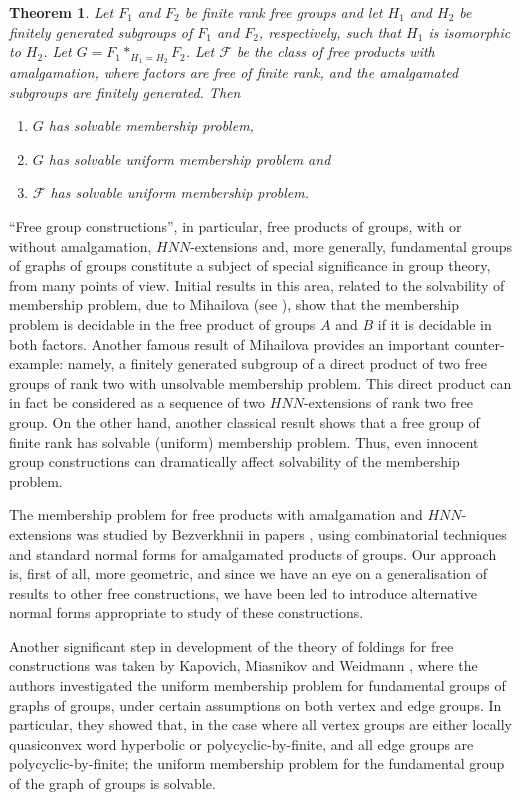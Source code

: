 \documentclass[a4paper,12pt]{article}
\newcommand{\cF}{{\cal{F}}}
\newtheorem{theorem}{Theorem}[section]
\numberwithin{equation}{section}
\numberwithin{figure}{section}
\renewcommand{\cF}{\mathcal{F}}
\newcommand{\be}{\begin{enumerate}}
\newcommand{\ee}{\end{enumerate}}
\begin{document}
\begin{theorem}\label{thm:membership}
Let $F_1$ and $F_2$ be finite rank free groups and let $H_1$ and $H_2$
be finitely generated subgroups of $F_1$ and $F_2$, respectively, such
that $H_1$ is isomorphic to $H_2$. Let $G=F_1 \ast_{H_1=H_2} F_2$. 
Let $\cF$ be the class of free products with amalgamation, where
factors are free of finite rank, and the amalgamated subgroups are
finitely generated. 
Then
\be
\item\label{it:membership}
$G$ has solvable membership problem, 
\item \label{it:uni-membership}
$G$ has solvable uniform  membership problem and 
\item\label{it:class-uni-membership}
$\cF$ has solvable uniform  membership problem.
\ee
\end{theorem}


``Free group constructions'', in particular, free products of groups,
with or without amalgamation, $HNN$-extensions
 and, more generally, fundamental groups
of graphs of groups constitute a subject of special significance in
group theory, from many points of view. Initial results in this area,
related to the solvability of membership problem,  due to Mihailova (see
\cite{mi59,mi68}), show that the membership problem is
decidable in the free product of groups $A$ and $B$ if it is decidable
in both factors. Another famous result of
Mihailova \cite{mi58}  provides an important counter-example:
 namely,  a finitely generated
subgroup of a direct product of two free groups of rank two with
unsolvable membership problem.  This direct
product can in fact be considered as a sequence of two $HNN$-extensions
of rank two free group. On the other hand, another classical
result \cite[Proposition 2.21]{LS} shows that a free group of finite rank has solvable (uniform)
membership problem. Thus,  even innocent group
constructions can dramatically affect solvability of the membership problem.

The membership problem for free products with amalgamation and
$HNN$-extensions was studied by Bezverkhnii in papers
\cite{bez81,bez86,bez90,bez91}, using  combinatorial
techniques and standard normal forms for  amalgamated products of
groups. Our approach is, first of all, more geometric, and since
we have an eye on a generalisation of results to other free
constructions, we have been led to introduce alternative normal forms
 appropriate to
study of these constructions.

Another significant step in development of the theory of foldings for  free constructions
 was taken by Kapovich, Miasnikov and Weidmann
\cite{KMW03}, where the authors investigated the uniform membership
problem for fundamental groups of graphs of groups, under certain
assumptions on both vertex and edge groups. In particular, they
showed that, in the case where all vertex groups are either locally
quasiconvex word hyperbolic or polycyclic-by-finite, and all edge
groups are polycyclic-by-finite; the uniform membership problem for the
fundamental group of the graph of groups is solvable.
\end{document}
